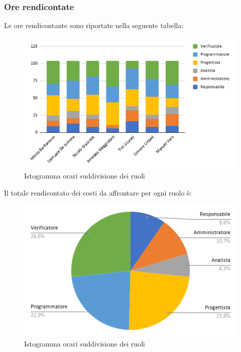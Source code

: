     \subsubsection{Ore rendicontate}
        Le ore rendicontante sono riportate nella seguente tabella:

        \begin{figure}[!h]
            \caption{Istogramma orari suddivisione dei ruoli}
            \vspace{5px}
            \includegraphics[scale=0.6]{../../../Images/Diagrammi/Istogrammi/ore rendicontate.png}
            \centering
        \end{figure}
        Il totale rendicontato dei costi da affrontare per ogni ruolo è:

        \begin{figure}[!h]
            \caption{Istogramma orari suddivisione dei ruoli}
            \vspace{5px}
            \includegraphics[scale=0.5]{../../../Images/Diagrammi/Diagramma a torta/ore rendicontate.png}
            \centering
        \end{figure}